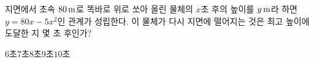 \hspace*{2mm}\begin{minipage}[t]{\dimexpr\linewidth-2mm\relax}\vspace{0pt}
지면에서 초속 $80\mkern3mu \mathrm{m}$로 똑바로 위로 쏘아 올린 물체의 $x$초 후의 높이를 $y\mkern3mu \mathrm{m}$라 하면 $y=80x-5x^2$인 관계가 성립한다. 이 물체가 다시 지면에 떨어지는 것은 최고 높이에 도달한 지 몇 초 후인가?
\begin{choices32}{$6$초}{$7$초}{$8$초}{$9$초}{$10$초}\end{choices32}\end{minipage}
